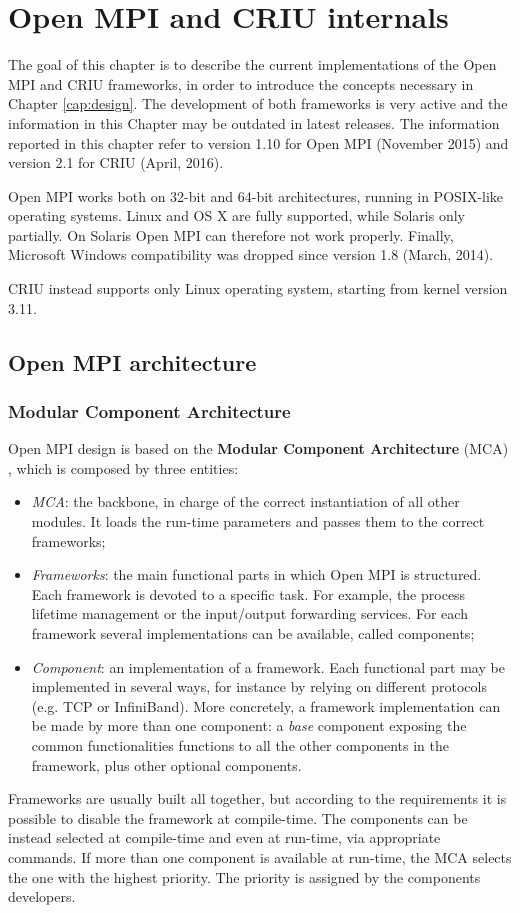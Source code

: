 \chapter{Open MPI and CRIU internals}
\label{cap:ompicriu}

The goal of this chapter is to describe the current implementations
of the Open MPI and CRIU frameworks, in order to introduce the concepts necessary
in Chapter \ref{cap:design}. The development of both frameworks is very active and
the information in this Chapter may be outdated in latest releases. The
information reported in this chapter refer to version 1.10 for Open MPI
(November 2015) and
version 2.1 for CRIU (April, 2016).

Open MPI works both on 32-bit and 64-bit architectures, running in POSIX-like operating
systems. Linux and OS X are fully supported, while Solaris 
only partially. On Solaris Open MPI can therefore not work properly. Finally,  Microsoft Windows compatibility was
dropped since version 1.8 (March, 2014).

CRIU instead supports only Linux operating system, starting from kernel
version 3.11.

\section{Open MPI architecture}
\subsection{Modular Component Architecture}

Open MPI design is based on the \textbf{Modular Component Architecture} (MCA)
\cite{gabriel2004open}, which is composed by
three entities:
\begin{itemize}
\item \emph{MCA}: the backbone, in charge of the correct instantiation
      of all other modules. It loads the run-time parameters and passes them to
      the correct frameworks;
\item \emph{Frameworks}: the main functional parts in which Open MPI is 
structured.
      Each framework is devoted to a specific task.
      For example, the process lifetime
      management or the input/output forwarding services. For each framework
      several implementations can be available, called components;
\item \emph{Component}: an implementation of a framework. Each functional
      part may be implemented in several ways, for instance by relying on different protocols (e.g. TCP or InfiniBand). More concretely, a framework implementation can be made by more than one component:
      a \emph{base} component exposing the common functionalities
      functions to all the other components in the framework, plus other
      optional components.
\end{itemize}
Frameworks are usually built all together, but according to the requirements
it is possible to disable the framework at compile-time. The
components can be instead selected at compile-time and even at run-time, via
appropriate commands. If more than one component is available at
run-time, the MCA
selects the one with the highest priority. The priority is assigned by the
components developers.

